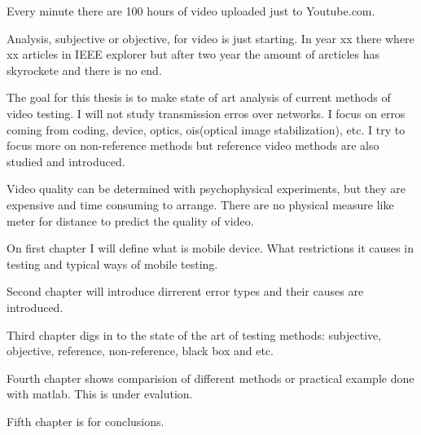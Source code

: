 
Every minute there are 100 hours of video uploaded just to Youtube.com.
~\cite{youtube} 

Analysis, subjective or objective, for video is just starting. In year xx
there where xx articles in IEEE explorer but after two year the amount of
arcticles has skyrockete and there is no end. 

The goal for this thesis is to make state of art analysis of current methods
of video testing. I will not study transmission erros over networks. I focus 
on erros coming from coding, device, optics,
ois(optical image stabilization), etc. I try to focus more on non-reference
methods but reference video methods are also studied and introduced. 

Video quality can be determined with psychophysical experiments, but they are
expensive and time consuming to arrange. There are no physical measure like
meter for distance to predict the quality of video. 


On first chapter I will define what is mobile device. What restrictions it
causes in testing and typical ways of mobile testing.  

Second chapter will introduce dirrerent error types and their causes are introduced. 

Third chapter digs in to the state of the art of testing methods: 
subjective, objective, reference, non-reference, black box and etc. 

Fourth chapter shows comparision of different methods or practical example
done with matlab. This is under evalution. 

Fifth chapter is for conclusions. 
